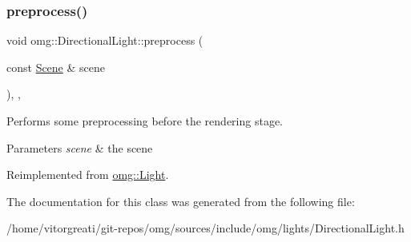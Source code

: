 \subsubsection{\texorpdfstring{preprocess()}{preprocess()}}
{\footnotesize\ttfamily void omg\+::\+Directional\+Light\+::preprocess (\begin{DoxyParamCaption}\item[{const \mbox{\hyperlink{classomg_1_1_scene}{Scene}} \&}]{scene }\end{DoxyParamCaption})\hspace{0.3cm}{\ttfamily [inline]}, {\ttfamily [override]}, {\ttfamily [virtual]}}



Performs some preprocessing before the rendering stage. 


\begin{DoxyParams}{Parameters}
{\em scene} & the scene \\
\hline
\end{DoxyParams}


Reimplemented from \mbox{\hyperlink{classomg_1_1_light_a8379b1dea7517c4e7fb6e0b5280c94d6}{omg\+::\+Light}}.



The documentation for this class was generated from the following file\+:\begin{DoxyCompactItemize}
\item 
/home/vitorgreati/git-\/repos/omg/sources/include/omg/lights/Directional\+Light.\+h\end{DoxyCompactItemize}
